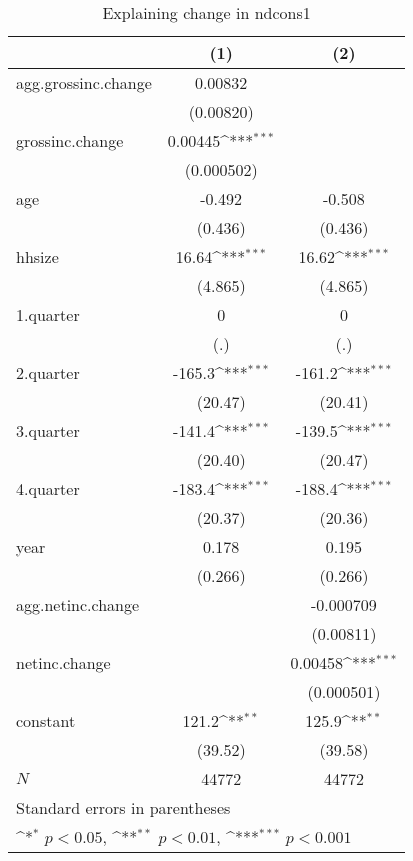 \begin{table}[htbp]\centering
\def\sym#1{\ifmmode^{#1}\else\(^{#1}\)\fi}
\caption{\label{tab:ndcons1-deltainc} Explaining change in ndcons1}
\begin{tabular}{l*{2}{c}}
\hline\hline
            &\multicolumn{1}{c}{(1)}         &\multicolumn{1}{c}{(2)}         \\
\hline
agg.grossinc.change&     0.00832         &                     \\
            &   (0.00820)         &                     \\
grossinc.change&     0.00445\sym{***}&                     \\
            &  (0.000502)         &                     \\
age         &      -0.492         &      -0.508         \\
            &     (0.436)         &     (0.436)         \\
hhsize      &       16.64\sym{***}&       16.62\sym{***}\\
            &     (4.865)         &     (4.865)         \\
1.quarter   &           0         &           0         \\
            &         (.)         &         (.)         \\
2.quarter   &      -165.3\sym{***}&      -161.2\sym{***}\\
            &     (20.47)         &     (20.41)         \\
3.quarter   &      -141.4\sym{***}&      -139.5\sym{***}\\
            &     (20.40)         &     (20.47)         \\
4.quarter   &      -183.4\sym{***}&      -188.4\sym{***}\\
            &     (20.37)         &     (20.36)         \\
year        &       0.178         &       0.195         \\
            &     (0.266)         &     (0.266)         \\
agg.netinc.change&                     &   -0.000709         \\
            &                     &   (0.00811)         \\
netinc.change&                     &     0.00458\sym{***}\\
            &                     &  (0.000501)         \\
constant    &       121.2\sym{**} &       125.9\sym{**} \\
            &     (39.52)         &     (39.58)         \\
\hline
\(N\)       &       44772         &       44772         \\
\hline\hline
\multicolumn{3}{l}{\footnotesize Standard errors in parentheses}\\
\multicolumn{3}{l}{\footnotesize \sym{*} \(p<0.05\), \sym{**} \(p<0.01\), \sym{***} \(p<0.001\)}\\
\end{tabular}
\end{table}
